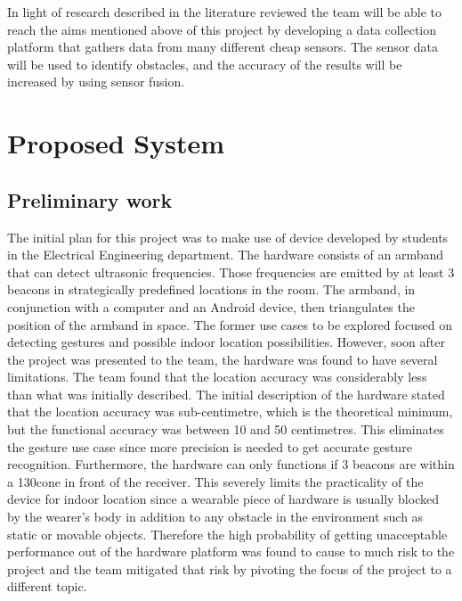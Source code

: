 \documentclass[prodmode,acmtosem]{acmsmall} %
\begin{document}
In light of research described in the literature reviewed the team will be able to reach the aims mentioned above of this project by developing a data collection platform that gathers data from many different cheap sensors. The sensor data will be used to identify obstacles, and the accuracy of the results will be increased by using sensor fusion.



\section{Proposed System}
\subsection{Preliminary work}
\label{sec:Prelim}



The initial plan for this project was to make use of device developed by students in the Electrical Engineering department. The hardware consists of an armband that can detect ultrasonic frequencies. Those frequencies are emitted by at least 3 beacons in strategically predefined locations in the room. The armband, in conjunction with a computer and an Android device, then triangulates the position of the armband in space.
The former use cases to be explored focused on detecting gestures and possible indoor location possibilities. However, soon after the project was presented to the team, the hardware was found to have several limitations. The team found that the location accuracy was considerably less than what was initially described. The initial description of the hardware stated that the location accuracy was sub-centimetre, which is the theoretical minimum, but the functional accuracy was between 10 and 50 centimetres. This eliminates the gesture use case since more precision is needed to get accurate gesture recognition.
Furthermore, the hardware can only functions if 3 beacons are within a 130\degree cone in front of the receiver. This severely limits the practicality of the device for indoor location since a wearable piece of hardware is usually blocked by the wearer's body in addition to any obstacle in the environment such as static or movable objects.
Therefore the high probability of getting unacceptable performance out of the hardware platform was found to cause to much risk to the project and the team mitigated that risk by pivoting the focus of the project to a different topic.
\end{document}
